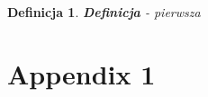 \documentclass[twoside]{iisthesis}
\newtheorem{mydef}{Definicja}
\begin{document}
\begin{mydef}
\textbf{Definicja} - pierwsza
\end{mydef}




 \clearpage
\appendix
\chapter{Appendix 1}


\clearpage
\pagestyle{plain}
\listofmyfigure
\listofmyequations
\listofmyalgorithm
\clearpage




\end{document}
